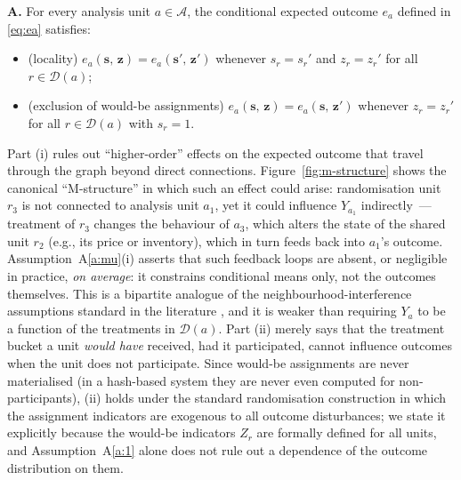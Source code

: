 \documentclass[sigconf,nonacm]{acmart}
\newcounter{assumption}
\newenvironment{assumption}{\refstepcounter{assumption}\par\medskip\noindent\textbf{A\theassumption.}\enspace}{\par\medskip}
\begin{document}
\begin{assumption}\label{a:mu}
For every analysis unit $a\in\mathcal A$, the conditional expected outcome $e_a$ defined in \eqref{eq:ea} satisfies:
\begin{itemize}
    \item[\textup{(i)}] \textup{(locality)} $e_a(\mathbf s,\,\mathbf z) = e_a(\mathbf s',\,\mathbf z')$ whenever $s_r=s_r'$ and $z_r=z_r'$ for all $r\in\mathcal D(a)$;
    \item[\textup{(ii)}] \textup{(exclusion of would-be assignments)} $e_a(\mathbf s,\,\mathbf z) = e_a(\mathbf s,\,\mathbf z')$ whenever $z_r=z_r'$ for all $r\in\mathcal D(a)$ with $s_r=1$.
\end{itemize}
\end{assumption}

Part (i) rules out ``higher-order'' effects on the expected outcome that travel through the graph beyond direct connections. Figure~\ref{fig:m-structure} shows the canonical ``M-structure'' in which such an effect could arise: randomisation unit $r_3$ is not connected to analysis unit $a_1$, yet it could influence $Y_{a_1}$ indirectly~--- treatment of $r_3$ changes the behaviour of $a_3$, which alters the state of the shared unit $r_2$ (e.g., its price or inventory), which in turn feeds back into $a_1$'s outcome. Assumption~A\ref{a:mu}(i) asserts that such feedback loops are absent, or negligible in practice, \emph{on average}: it constrains conditional means only, not the outcomes themselves. This is a bipartite analogue of the neighbourhood-interference assumptions standard in the literature \cite{aronow2017estimating,harshaw2023erl,shi2025scalableanalysisbipartiteexperiments}, and it is weaker than requiring $Y_a$ to be a function of the treatments in $\mathcal D(a)$. Part (ii) merely says that the treatment bucket a unit \emph{would have} received, had it participated, cannot influence outcomes when the unit does not participate. Since would-be assignments are never materialised (in a hash-based system they are never even computed for non-participants), (ii) holds under the standard randomisation construction in which the assignment indicators are exogenous to all outcome disturbances; we state it explicitly because the would-be indicators $Z_r$ are formally defined for all units, and Assumption~A\ref{a:1} alone does not rule out a dependence of the outcome distribution on them.
\end{document}
